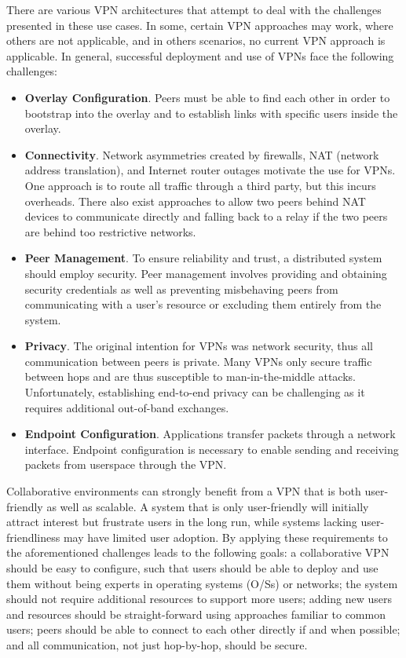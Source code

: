 There are various VPN architectures that attempt to deal with the challenges
presented in these use cases.  In some, certain VPN approaches may work, where
others are not applicable, and in others scenarios, no current VPN approach is
applicable.  In general, successful deployment and use of VPNs face the
following challenges:  

\begin{itemize}

\item {\bf Overlay Configuration}. Peers must be able to find each other in
order to bootstrap into the overlay and to establish links with specific users
inside the overlay.

\item {\bf Connectivity}. Network asymmetries created by firewalls, NAT
(network address translation), and Internet router outages motivate the use for
VPNs.  One approach is to route all traffic through a third party, but this
incurs overheads.  There also exist approaches to allow two peers behind NAT
devices to communicate directly and falling back to a relay if the two peers
are behind too restrictive networks.

\item {\bf Peer Management}. To ensure reliability and trust, a distributed
system should employ security.  Peer management involves providing and
obtaining security credentials as well as preventing misbehaving peers from
communicating with a user's resource or excluding them entirely from the
system.

\item {\bf Privacy}. The original intention for VPNs was network security, thus
all communication between peers is private.  Many VPNs only secure traffic
between hops and are thus susceptible to man-in-the-middle attacks.
Unfortunately, establishing end-to-end privacy can be challenging as it
requires additional out-of-band exchanges.

\item {\bf Endpoint Configuration}. Applications transfer packets through a
network interface.  Endpoint configuration is necessary to enable sending and
receiving packets from userspace through the VPN.

\end{itemize}

Collaborative environments can strongly benefit from a VPN that is both
user-friendly as well as scalable.  A system that is only user-friendly will
initially attract interest but frustrate users in the long run, while systems
lacking user-friendliness may have limited user adoption.  By applying these
requirements to the aforementioned challenges leads to the following goals: a
collaborative VPN should be easy to configure, such that users should be able
to deploy and use them without being experts in operating systems (O/Ss) or
networks; the system should not require additional resources to support more
users; adding new users and resources should be straight-forward using
approaches familiar to common users; peers should be able to connect to each
other directly if and when possible; and all communication, not just
hop-by-hop, should be secure.

